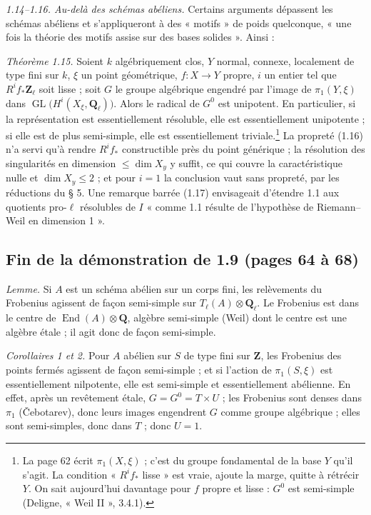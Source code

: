 \documentclass[11pt,a4paper]{article}
\begin{document}
\emph{1.14--1.16. Au-delà des schémas abéliens.} Certains arguments dépassent
les schémas abéliens et s'appliqueront à des « motifs » de poids quelconque,
« une fois la théorie des motifs assise sur des bases solides ». Ainsi :

\emph{Théorème 1.15.} Soient $k$ algébriquement clos, $Y$ normal, connexe,
localement de type fini sur $k$, $\xi$ un point géométrique, $f : X \to Y$
propre, $i$ un entier tel que $R^i f_*\mathbf{Z}_\ell$ soit lisse ; soit $G$ le
groupe algébrique engendré par l'image de $\pi_1(Y, \xi)$ dans
$\operatorname{GL}\bigl(H^i(X_\xi, \mathbf{Q}_\ell)\bigr)$. Alors le radical de
$G^0$ est unipotent. En particulier, si la représentation est essentiellement
résoluble, elle est essentiellement unipotente ; si elle est de plus
semi-simple, elle est essentiellement triviale.\footnote{La page 62 écrit
$\pi_1(X,\xi)$ ; c'est du groupe fondamental de la base $Y$ qu'il s'agit. La
condition « $R^i f_*$ lisse » est vraie, ajoute la marge, quitte à rétrécir $Y$.
On sait aujourd'hui davantage pour $f$ propre et lisse : $G^0$ est
semi-simple (Deligne, « Weil II », 3.4.1).} La propreté (1.16) n'a servi qu'à
rendre $R^i f_*$ constructible près du point générique ; la résolution des
singularités en dimension $\leq \dim X_y$ y suffit, ce qui couvre la
caractéristique nulle et $\dim X_y \leq 2$ ; et pour $i = 1$ la conclusion vaut
sans propreté, par les réductions du § 5. Une remarque barrée (1.17) envisageait
d'étendre 1.1 aux quotients pro-$\ell$ résolubles de $I$ « comme 1.1 résulte de
l'hypothèse de Riemann--Weil en dimension 1 ».

\subsection*{Fin de la démonstration de 1.9 (pages 64 à 68)}

\emph{Lemme.} Si $A$ est un schéma abélien sur un corps fini, les relèvements du
Frobenius agissent de façon semi-simple sur $T_\ell(A) \otimes \mathbf{Q}_\ell$.
Le Frobenius est dans le centre de $\operatorname{End}(A) \otimes \mathbf{Q}$,
algèbre semi-simple (Weil) dont le centre est une algèbre étale ; il agit donc de
façon semi-simple.

\emph{Corollaires 1 et 2.} Pour $A$ abélien sur $S$ de type fini sur
$\mathbf{Z}$, les Frobenius des points fermés agissent de façon semi-simple ; et
si l'action de $\pi_1(S,\xi)$ est essentiellement nilpotente, elle est
semi-simple et essentiellement abélienne. En effet, après un revêtement étale,
$G = G^0 = T \times U$ ; les Frobenius sont denses dans $\pi_1$ (Čebotarev),
donc leurs images engendrent $G$ comme groupe algébrique ; elles sont
semi-simples, donc dans $T$ ; donc $U = 1$.
\end{document}
